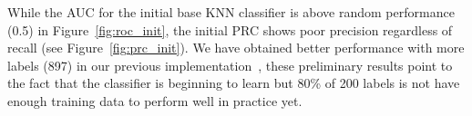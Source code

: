 While the AUC for the initial base KNN classifier is above random performance (0.5) in Figure~\ref{fig:roc_init}, the initial PRC shows poor precision regardless of recall (see Figure~\ref{fig:prc_init}).
We have obtained better performance with more labels (897) in our previous implementation~\cite{tchoua2019polyner}, these preliminary results point to the fact that the classifier is beginning to learn but 80\% of 200 labels is not have enough training data to perform well in practice yet.



